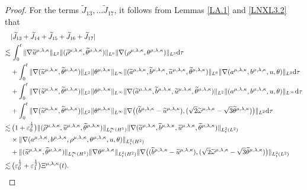 \documentclass[reqno,11pt]{amsart}
\theoremstyle{plain}
\numberwithin{equation}{section}
\newcommand{\eps}{{\varepsilon}}
\begin{document}
\begin{proof}
For the terms $\widetilde{J}_{13},\dots\widetilde{J}_{17}$,
it follows from Lemmas \ref{LA.1} and \ref{LNXL3.2} that
\begin{align}\label{LNXEG4.38}
&|\widetilde{J}_{13}+\widetilde{J}_{14}+\widetilde{J}_{15}+\widetilde{J}_{16}+\widetilde{J}_{17}|   \nonumber\\
\lesssim&\,\int_0^t \|\nabla\widetilde{u}^{\mu,\lambda,\kappa}\|_{L^2}\|(\widetilde{\rho}^{\mu,\lambda,\kappa},\widetilde{\theta}^{\mu,\lambda,\kappa})\|_{L^6} \|\nabla (\rho^{\mu,\lambda,\kappa},\theta^{\mu,\lambda,\kappa})\|_{L^3} {\rm d}\tau \nonumber\\
&+\int_0^t\|\nabla(\widetilde{u}^{\mu,\lambda,\kappa},\widetilde{\theta}^{\mu,\lambda,\kappa})\|_{L^2}\|\theta^{\mu,\lambda,\kappa}\|_{L^\infty}\|(\widetilde{a}^{\mu,\lambda,\kappa},\widetilde{b}^{\mu,\lambda,\kappa},\widetilde u^{\mu,\lambda,\kappa},\widetilde\theta^{\mu,\lambda,\kappa})\|_{L^6} \|\nabla( a^{\mu,\lambda,\kappa},b^{\mu,\lambda,\kappa},  u,\theta)\|_{L^3}                    {\rm d}\tau\nonumber\\
&+\int_0^t\|\nabla(\widetilde{u}^{\mu,\lambda,\kappa},\widetilde{\theta}^{\mu,\lambda,\kappa})\|_{L^2}\|\theta^{\mu,\lambda,\kappa}\|_{L^\infty}\|\nabla(\widetilde{a}^{\mu,\lambda,\kappa},\widetilde{b}^{\mu,\lambda,\kappa},\widetilde u^{\mu,\lambda,\kappa},\widetilde{\theta}^{\mu,\lambda,\kappa})\|_{L^2}\| ( a^{\mu,\lambda,\kappa},b^{\mu,\lambda,\kappa},u,\theta)\|_{L^\infty}                  {\rm d}\tau\nonumber\\
&+\int_0^t\|\nabla(\widetilde{u}^{\mu,\lambda,\kappa},\widetilde{\theta}^{\mu,\lambda,\kappa})\|_{L^2} \|\theta^{\mu,\lambda,\kappa}\|_{L^\infty}\|\nabla\big((\widetilde{b}^{\mu,\lambda,\kappa}-\widetilde u^{\mu,\lambda,\kappa}),(\sqrt{2}\widetilde{\omega}^{\mu,\lambda,\kappa}-\sqrt{3}\widetilde \theta^{\mu,\lambda,\kappa})\big)\|_{L^2}{\rm d}\tau \nonumber\\
\lesssim&\, \big(1+\eps_0^\frac{1}{2}\big)\| (\widetilde{\rho}^{\mu,\lambda,\kappa},\widetilde{u}^{\mu,\lambda,\kappa},\widetilde{\theta}^{\mu,\lambda,\kappa})\|_{L_t^\infty(H^1)}\|\nabla(\widetilde a^{\mu,\lambda,\kappa},\widetilde b^{\mu,\lambda,\kappa},\widetilde u^{\mu,\lambda,\kappa},\widetilde \theta^{\mu,\lambda,\kappa})\|_{L_t^2(L^2)} \nonumber\\
& \times  \|\nabla(  a^{\mu,\lambda,\kappa},  b^{\mu,\lambda,\kappa}, \rho^{\mu,\lambda,\kappa},  \theta^{\mu,\lambda,\kappa},  u ,  \theta )\|_{L_t^2(H^2)}\nonumber\\
&+\| ( \widetilde{u}^{\mu,\lambda,\kappa},\widetilde{\theta}^{\mu,\lambda,\kappa})\|_{L_t^\infty(H^1)}\|\nabla\theta^{\mu,\lambda,\kappa}\|_{L_t^2(H^2)}\|\nabla\big((\widetilde{b}^{\mu,\lambda,\kappa}-\widetilde u^{\mu,\lambda,\kappa}),(\sqrt{2}\widetilde{\omega}^{\mu,\lambda,\kappa}-\sqrt{3}\widetilde \theta^{\mu,\lambda,\kappa})\big)\|_{L_t^2(L^2)}\nonumber\\
\lesssim&\,  \big(\eps_0^\frac{1}{2}+\eps_1^\frac{1}{2}\big){\Xi} ^{\mu,\lambda,\kappa}(t).
\end{align}  


\end{proof}
\end{document}
